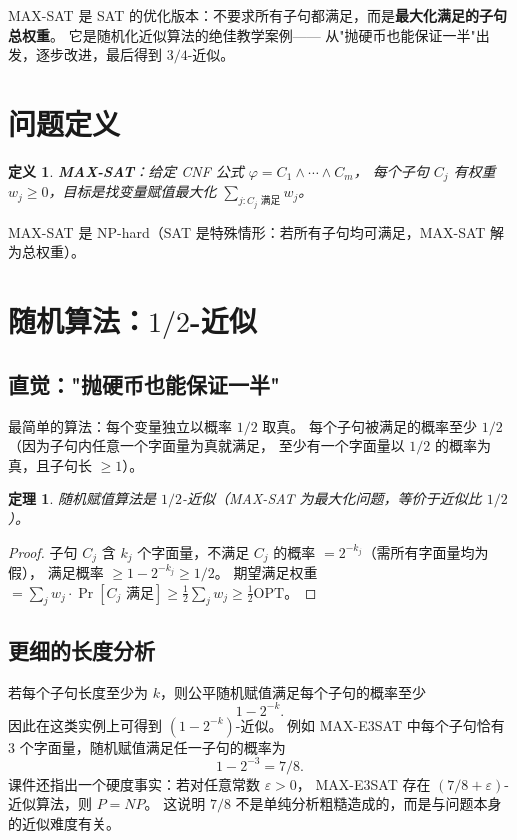 \documentclass[UTF8,openany,12pt]{ctexbook}
\newtheorem{definition}{定义}[chapter]
\newtheorem{theorem}{定理}[chapter]
\theoremstyle{remark}
\newcommand{\OPT}{\mathrm{OPT}}
\begin{document}
MAX-SAT 是 SAT 的优化版本：不要求所有子句都满足，而是\textbf{最大化满足的子句总权重}。
它是随机化近似算法的绝佳教学案例——
从"抛硬币也能保证一半"出发，逐步改进，最后得到 $3/4$-近似。

\section{问题定义}

\begin{definition}
\textbf{MAX-SAT}：给定 CNF 公式 $\varphi = C_1 \wedge \cdots \wedge C_m$，
每个子句 $C_j$ 有权重 $w_j \ge 0$，目标是找变量赋值最大化 $\sum_{j: C_j \text{ 满足}} w_j$。
\end{definition}

MAX-SAT 是 NP-hard（SAT 是特殊情形：若所有子句均可满足，MAX-SAT 解为总权重）。

\section[随机算法：二分之一近似]{随机算法：$1/2$-近似}

\subsection{直觉："抛硬币也能保证一半"}

最简单的算法：每个变量独立以概率 $1/2$ 取真。
每个子句被满足的概率至少 $1/2$（因为子句内任意一个字面量为真就满足，
至少有一个字面量以 $1/2$ 的概率为真，且子句长 $\ge 1$）。

\begin{theorem}
随机赋值算法是 $1/2$-近似（MAX-SAT 为最大化问题，等价于近似比 $1/2$）。
\end{theorem}

\begin{proof}
子句 $C_j$ 含 $k_j$ 个字面量，不满足 $C_j$ 的概率 $= 2^{-k_j}$（需所有字面量均为假），
满足概率 $\ge 1-2^{-k_j} \ge 1/2$。
期望满足权重 $= \sum_j w_j \cdot \Pr[C_j \text{ 满足}] \ge \frac{1}{2}\sum_j w_j \ge \frac{1}{2}\OPT$。
\end{proof}

\subsection{更细的长度分析}

若每个子句长度至少为 $k$，则公平随机赋值满足每个子句的概率至少
\[
  1-2^{-k}.
\]
因此在这类实例上可得到 $(1-2^{-k})$-近似。
例如 MAX-E3SAT 中每个子句恰有 3 个字面量，随机赋值满足任一子句的概率为
\[
  1-2^{-3}=7/8.
\]
课件还指出一个硬度事实：若对任意常数 $\varepsilon>0$，
MAX-E3SAT 存在 $(7/8+\varepsilon)$-近似算法，则 $P=NP$。
这说明 $7/8$ 不是单纯分析粗糙造成的，而是与问题本身的近似难度有关。
\end{document}
